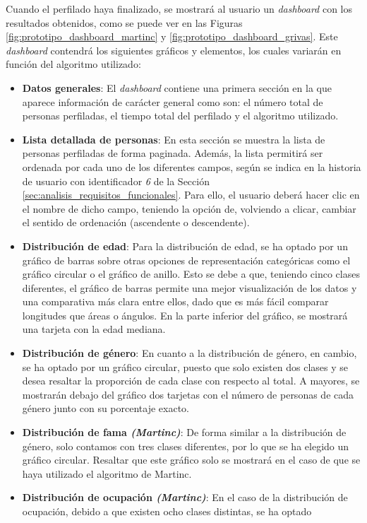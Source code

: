 \bigskip
Cuando el perfilado haya finalizado, se mostrará al usuario un \textit{dashboard} con los resultados obtenidos,
como se puede ver en las Figuras \ref{fig:prototipo_dashboard_martinc} y \ref{fig:prototipo_dashboard_grivas}. 
Este \textit{dashboard} contendrá los siguientes gráficos y elementos, los cuales variarán en función del algoritmo utilizado:

\begin{itemize}
	\item \textbf{Datos generales}: El \textit{dashboard} contiene una primera sección en la que aparece información de carácter general
		como son: el número total de personas perfiladas, el tiempo total del perfilado y el algoritmo utilizado.
	\item \textbf{Lista detallada de personas}: En esta sección se muestra la lista de personas perfiladas de forma paginada. Además, la lista
		permitirá ser ordenada por cada uno de los diferentes campos, según se indica en la historia de usuario con identificador 
		\textit{6} de la Sección \ref{sec:analisis_requisitos_funcionales}. Para ello, el usuario deberá hacer clic en el nombre de dicho campo, teniendo
		la opción de, volviendo a clicar, cambiar el sentido de ordenación (ascendente o descendente).
	\item \textbf{Distribución de edad}: Para la distribución de edad, se ha optado por un gráfico de barras sobre otras opciones de representación
		categóricas como el gráfico circular o el gráfico de anillo. Esto se debe a que, teniendo cinco clases diferentes, el gráfico de barras permite una mejor visualización 
		de los datos y una comparativa más clara entre ellos, dado que es más fácil comparar longitudes que áreas o ángulos. En la parte inferior del gráfico,
		se mostrará una tarjeta con la edad mediana.
	\item \textbf{Distribución de género}: En cuanto a la distribución de género, en cambio, se ha optado por un gráfico circular, puesto que solo existen dos clases
		y se desea resaltar la proporción de cada clase con respecto al total. A mayores, se mostrarán debajo del gráfico dos tarjetas con el número de personas
		de cada género junto con su porcentaje exacto.
	\item \textbf{Distribución de fama \textit{(Martinc)}}: De forma similar a la distribución de género, solo contamos con tres clases diferentes, por lo que
		se ha elegido un gráfico circular. Resaltar que este gráfico solo se mostrará en el caso de que se haya utilizado el algoritmo de Martinc.
	\item \textbf{Distribución de ocupación \textit{(Martinc)}}: En el caso de la distribución de ocupación, debido a que existen ocho clases distintas, se ha optado

\end{itemize}
